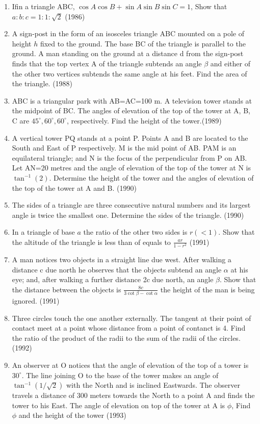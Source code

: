 \documentclass[12pt]{article}
\begin{document}
\begin{enumerate}
\item Ifin a triangle ABC, $\cos A\cos B+\sin A\sin B \sin C=1$, Show that $a:b:c=1:1:\sqrt{2}$ (1986)
\item A sign-post in the form of an isosceles triangle ABC mounted on a pole of height $h$ fixed to the ground. The base BC of the triangle is parallel to the ground. A man standing on the ground at a distance d from the sign-post finds that the top vertex A of the triangle subtends an angle $\beta$ and either of the other two vertices subtends the same angle at his feet. Find the area of the triangle. (1988)
\item ABC is a triangular park with AB=AC=100 m. A television tower stands at the midpoint of BC. The angles of elevation of the top of the tower at A, B, C are $45^\circ,60^\circ,60^\circ$, respectively. Find the height of the tower.(1989)
\item  A vertical tower PQ stands at a point P. Points A and B are located to the South and East of P respectively. M is the mid point of AB. PAM is an equilateral triangle; and N is the focus of the perpendicular from P on AB. Let AN=20 metres and the angle of elevation of the top of the tower at N is $\tan^{-1}(2)$. Determine the height of the tower and the angles of elevation of the top of the tower at A and B. (1990)
\item The sides of a triangle are three consecutive natural numbers and its largest angle is twice the smallest one. Determine the sides of the triangle. (1990)
\item In a triangle of base $a$ the ratio of the other two sides is $r(<1)$. Show that the altitude of the triangle is less than of equals to $\frac{ar}{1-r^2}$ (1991)
\item A man notices two objects in a straight line due west. After walking a distance c due north he observes that the objects subtend an angle $\alpha$ at his eye; and, after walking a further distance 2c due north, an angle $\beta$. Show that the distance between the objects is $\frac{8c}{3\cot \beta-\cot \alpha}$ the height of the man is being ignored. (1991)
\item Three circles touch the one another externally. The tangent at their point of contact meet at a point whose distance from a point of contanct is 4. Find the ratio of the product of the radii to the sum of the radii of the circles. (1992)
\item An observer at O notices that the angle of elevation of the top of a tower is $30^\circ$. The line joining O to the base of the tower makes an angle of $\tan^{-1} (1/\sqrt{2})$ with the North and is inclined Eastwards. The observer travels a distance of 300 meters towards the North to a point A and finds the tower to his East. The angle of elevation on top of the tower at A is $\phi$, Find $\phi$ and the height of the tower (1993)

\end{enumerate}
\end{document}
